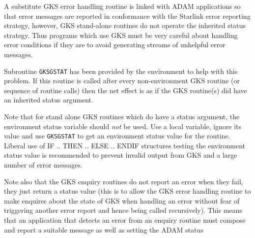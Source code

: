 \documentclass[twoside,11pt]{article}
\newcommand{\htmlref}[2]{#1}
\renewcommand{\_}{\texttt{\symbol{95}}}
\begin{document}
A substitute GKS error handling routine is linked with ADAM applications so
that error messages are reported in conformance with the Starlink error
reporting strategy, however, GKS stand-alone routines do not operate the
inherited status strategy. Thus programs which use GKS must be very careful
about handling error conditions if they are to avoid generating streams
of unhelpful error messages.

Subroutine \htmlref{{\tt GKS\_GSTAT}}{GKS_GSTAT}
 has been provided by the environment to help with this problem.
If this routine is called after every non-environment GKS routine
(or sequence of routine calls) then the
net effect is as if the GKS routine(s) did have an inherited status argument.

Note that for stand alone GKS routines which do have a status argument, the
environment status variable should {\em not} be used. Use a local variable,
ignore its value and use {\tt GKS\_GSTAT} to get an environment status value 
for the
routine. Liberal use of IF .. THEN .. ELSE .. ENDIF structures testing the
environment status value is recommended to prevent invalid output from GKS and
a large number of error messages.

Note also that the GKS enquiry routines do not report an error when they fail,
they just return a status value (this is to allow the GKS error handling
routine to make enquires about the state of GKS when handling an error without
fear of triggering another error report and hence being called recursively).
This means that an application that detects an error from an enquiry routine
must compose and report a suitable message as well as setting the ADAM status
\end{document}
